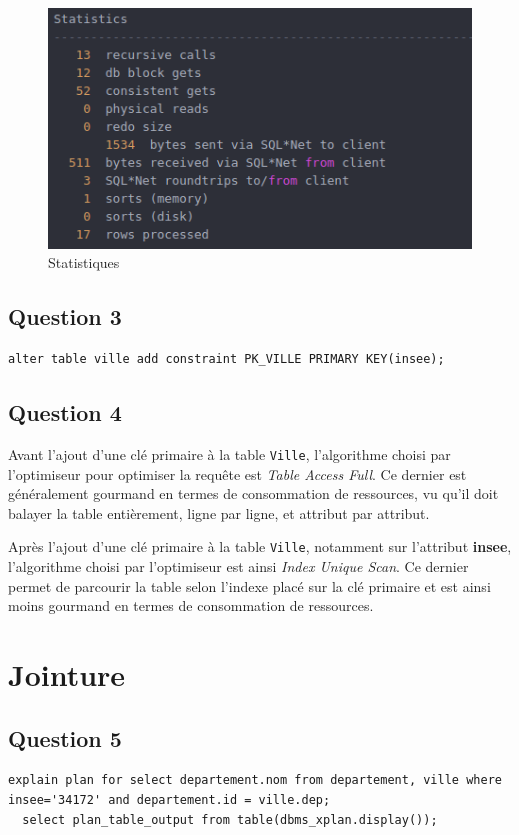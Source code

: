 \documentclass[a4paper,12pt]{article}
\begin{document}
\begin{figure}[!ht]
  \centering
  \includegraphics[scale=0.6]{images/q2_2.png}
  \caption{Statistiques}
\end{figure}

\newpage

\subsection{Question 3}
\begin{lstlisting}[caption={ajout d'une clé primaire sur la table ville en utilisant l'attribut insee}]
  alter table ville add constraint PK_VILLE PRIMARY KEY(insee);
\end{lstlisting}

\subsection{Question 4}
Avant l'ajout d'une clé primaire à la table \texttt{Ville}, l'algorithme choisi par l'optimiseur pour optimiser la requête est \textit{Table Access Full}. Ce dernier est généralement gourmand en termes de consommation de ressources, vu qu'il doit balayer la table entièrement, ligne par ligne, et attribut par attribut.

Après l'ajout d'une clé primaire à la table \texttt{Ville}, notamment sur l'attribut \textbf{insee}, l'algorithme choisi par l'optimiseur est ainsi \textit{Index Unique Scan}. Ce dernier permet de parcourir la table selon l'indexe placé sur la clé primaire et est ainsi moins gourmand en termes de consommation de ressources.

\section{Jointure}
\subsection{Question 5}
\begin{lstlisting}[caption={plan d'exécution choisi par l'optimiseur pour la requête permettant d'afficher le nom du département pour la ville dont le numéro insee est 34172}]
  explain plan for select departement.nom from departement, ville where insee='34172' and departement.id = ville.dep;
  select plan_table_output from table(dbms_xplan.display());
\end{lstlisting}
\end{document}
